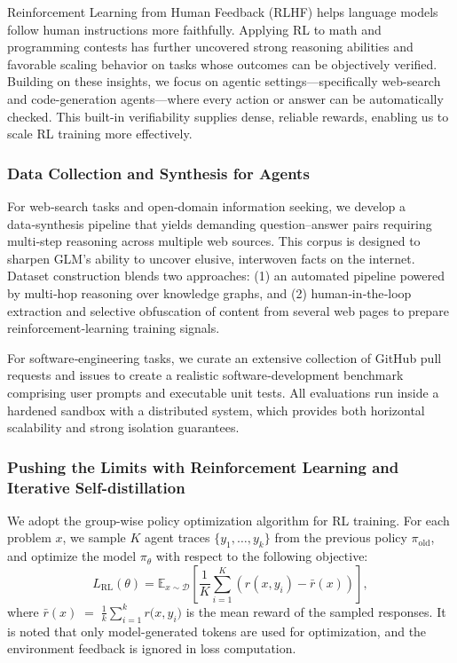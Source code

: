 Reinforcement Learning from Human Feedback (RLHF) helps language models follow human instructions more faithfully. Applying RL to math and programming contests has further uncovered strong reasoning abilities and favorable scaling behavior on tasks whose outcomes can be objectively verified. Building on these insights, we focus on agentic settings—specifically web-search and code-generation agents—where every action or answer can be automatically checked. This built-in verifiability supplies dense, reliable rewards, enabling us to scale RL training more effectively.


\subsubsection{Data Collection and Synthesis for Agents}


For web‑search tasks and open‑domain information seeking, we develop a data‑synthesis pipeline that yields demanding question–answer pairs requiring multi‑step reasoning across multiple web sources. This corpus is designed to sharpen GLM’s ability to uncover elusive, interwoven facts on the internet. Dataset construction blends two approaches: (1) an automated pipeline powered by multi‑hop reasoning over knowledge graphs, and (2) human‑in‑the‑loop extraction and selective obfuscation of content from several web pages to prepare reinforcement‑learning training signals.


For software‑engineering tasks, we curate an extensive collection of GitHub pull requests and issues to create a realistic software‑development benchmark comprising user prompts and executable unit tests. All evaluations run inside a hardened sandbox with a distributed system, which provides both horizontal scalability and strong isolation guarantees.

\subsubsection{Pushing the Limits with Reinforcement Learning and Iterative Self-distillation}

We adopt the group-wise policy optimization algorithm for RL training.
For each problem \(x\), we sample \(K\) agent traces \(\{y_1,\dots,y_k\}\) from the previous policy
\(\pi_{\text{old}}\), and optimize the model \(\pi_\theta\) with respect to the following objective:
\[
L_{\text{RL}}(\theta)
   = \mathbb{E}_{x\sim\mathcal{D}}\!\left[
        \frac{1}{K}\sum_{i=1}^{K}
        \left(
            r(x,y_i) - \bar{r}(x)
        \right)
     \right],
\]
where $\bar{r}(x) \;=\; \frac{1}{k}\sum_{i=1}^{k} r\bigl(x,y_i\bigr)$
is the mean reward of the sampled responses. It is noted that only model-generated tokens are used for optimization, and the environment feedback is ignored in loss computation. 


